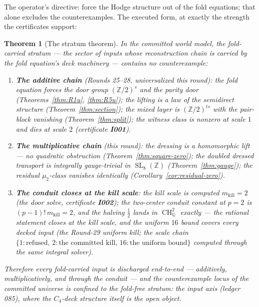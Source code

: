 \documentclass[11pt]{article}
\newcommand{\Z}{\mathbb Z}
\newcommand{\Q}{\mathbb Q}
\newcommand{\SL}{\operatorname{SL}}
\newcommand{\CH}{\operatorname{CH}}
\newtheorem{theorem}{Theorem}[section]
\begin{document}
The operator's directive: force the Hodge structure out of the fold
equations; that alone excludes the counterexamples. The executed form,
at exactly the strength the certificates support:

\begin{theorem}[The stratum theorem]\label{thm:stratum}
In the committed world model, the fold-carried stratum --- the sector
of inputs whose reconstruction chain is carried by the fold equation's
deck machinery --- contains no counterexample:
\begin{enumerate}
\item \textbf{The additive chain} (Rounds 25--28, universalized this
round): the fold equation forces the door group $(\Z/2)^s$ and the
parity door (Theorems~\ref{thm:R1u}, \ref{thm:R5u}); the lifting is a
law of the semidirect structure (Theorem~\ref{thm:section}); the
mixed layer is $(\Z/2)^{ts}$ with the pair-block vanishing
(Theorem~\ref{thm:split}); the witness class is nonzero at scale $1$
and dies at scale $2$ (certificate \textbf{I001}).
\item \textbf{The multiplicative chain} (this round): the dressing is
a homomorphic lift --- no quadratic obstruction
(Theorem~\ref{thm:square-zero}); the doubled dressed transport is
integrally gauge-trivial in $\SL_8(\Z)$ (Theorem~\ref{thm:gauge});
the residual $\mu_2$-class vanishes identically
(Corollary~\ref{cor:residual-zero}).
\item \textbf{The conduit closes at the kill scale}: the kill scale is
computed $m_{\mathrm{kill}}=2$ (the door solve, certificate
\textbf{I002}); the two-center conduit constant at $p=2$ is
$(p-1)!\,m_{\mathrm{kill}}=2$, and the halving $\tfrac12$ lands in
$\CH^2_\Q$ exactly --- the rational statement closes at the kill
scale, and the uniform $16$ bound covers every decked input (the
Round-29 uniform kill; the scale chain
$\{1:\text{refused},\,2:\text{the committed kill},\,
16:\text{the uniform bound}\}$ computed through the same integral
solver).
\end{enumerate}
Therefore every fold-carried input is discharged end-to-end ---
additively, multiplicatively, and through the conduit --- and the
counterexample locus of the committed universe is confined to the
\emph{fold-free stratum}: the input axis (ledger 085), where the
$C_4$-deck structure itself is the open object.
\end{theorem}
\end{document}

